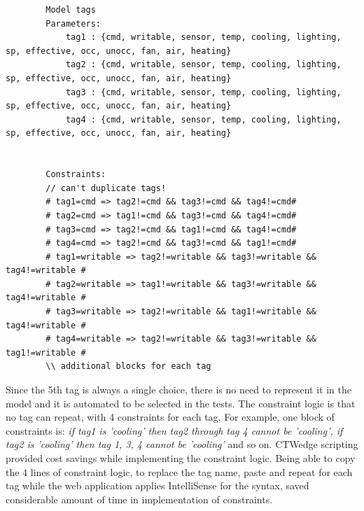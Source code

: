 \documentclass[conference]{IEEEtran}
\begin{document}
	\begin{lstlisting}
		Model tags
		Parameters:
			tag1 : {cmd, writable, sensor, temp, cooling, lighting, sp, effective, occ, unocc, fan, air, heating}
			tag2 : {cmd, writable, sensor, temp, cooling, lighting, sp, effective, occ, unocc, fan, air, heating}
			tag3 : {cmd, writable, sensor, temp, cooling, lighting, sp, effective, occ, unocc, fan, air, heating}
			tag4 : {cmd, writable, sensor, temp, cooling, lighting, sp, effective, occ, unocc, fan, air, heating}
	 
	 
		Constraints:
		// can't duplicate tags!
		# tag1=cmd => tag2!=cmd && tag3!=cmd && tag4!=cmd#
		# tag2=cmd => tag1!=cmd && tag3!=cmd && tag4!=cmd#
		# tag3=cmd => tag2!=cmd && tag1!=cmd && tag4!=cmd#
		# tag4=cmd => tag2!=cmd && tag3!=cmd && tag1!=cmd#
		# tag1=writable => tag2!=writable && tag3!=writable && tag4!=writable #
		# tag2=writable => tag1!=writable && tag3!=writable && tag4!=writable #
		# tag3=writable => tag2!=writable && tag1!=writable && tag4!=writable #
		# tag4=writable => tag2!=writable && tag3!=writable && tag1!=writable #	
		\\ additional blocks for each tag 
	\end{lstlisting}



	
	Since the 5th tag is always a single choice, there is no need to represent it in the model and it is automated to be selected in the tests.
	The constraint logic is that no tag can repeat, with 4 constraints for each tag.
	For example, one block of constraints is: \textit{if tag1 is 'cooling' then tag2 through tag 4 cannot be 'cooling', if tag2 is 'cooling' then tag 1, 3, 4 cannot be 'cooling'} and so on.
	CTWedge scripting provided cost savings while implementing the constraint logic. 
	Being able to copy the 4 lines of constraint logic, to replace the tag name, paste and repeat for each tag while the web application applies IntelliSense for the syntax, saved considerable amount of time in implementation of constraints.
\end{document}
